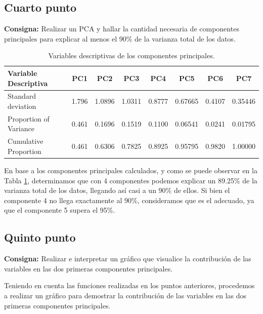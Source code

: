 \documentclass{article} %
\begin{document}
\subsection{Cuarto punto}

\textbf{Consigna:} Realizar un PCA y hallar la cantidad necesaria de componentes principales para explicar al menos el 90\% de la varianza total de los datos.

\begin{table}[H]
	\centering
		\begin{tabular}{||l || c | c | c | c | c | c | c ||}
			\hline
			\hline
			Variable Descriptiva & PC1 & PC2 & PC3 & PC4 & PC5 & PC6 & PC7\\
			\hline			
			\hline
			Standard deviation  &   1.796 &1.0896& 1.0311& 0.8777& 0.67665 &0.4107 &0.35446\\
			\hline
			Proportion of Variance &0.461 &0.1696 &0.1519 &0.1100 &0.06541 &0.0241& 0.01795\\
			\hline			
			Cumulative Proportion  &0.461 &0.6306 &0.7825 &0.8925 &0.95795 &0.9820 &1.00000\\
			\hline
			\hline
		\end{tabular}
		\caption{Variables descriptivas de los componentes principales.}
		\label{tab:table-punto-3-4}
\end{table}

En base a los componentes principales calculados, y como se puede observar en la Tabla \ref{tab:table-punto-3-4}, determinamos que con 4 componentes podemos explicar un 89.25\% de la varianza total de los datos, llegando así casi a un 90\% de ellos. Si bien el componente 4 no llega exactamente al 90\%, consideramos que es el adecuado, ya que el componente 5 supera el 95\%.

\subsection{Quinto punto}

\textbf{Consigna:} Realizar e interpretar un gráfico que visualice la contribución de las variables en las dos primeras componentes principales.

Teniendo en cuenta las funciones realizadas en los puntos anteriores, procedemos a realizar un gráfico para demostrar la contribución de las variables en las dos primeras componentes principales. 
\end{document}
